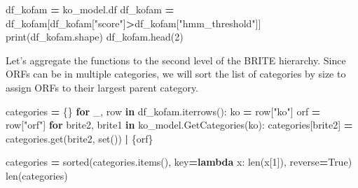 \documentclass[
]{book}
\newenvironment{Shaded}{\begin{snugshade}}{\end{snugshade}}
\newcommand{\BuiltInTok}[1]{#1}
\newcommand{\ControlFlowTok}[1]{\textcolor[rgb]{0.13,0.29,0.53}{\textbf{#1}}}
\newcommand{\DecValTok}[1]{\textcolor[rgb]{0.00,0.00,0.81}{#1}}
\newcommand{\KeywordTok}[1]{\textcolor[rgb]{0.13,0.29,0.53}{\textbf{#1}}}
\newcommand{\NormalTok}[1]{#1}
\newcommand{\OperatorTok}[1]{\textcolor[rgb]{0.81,0.36,0.00}{\textbf{#1}}}
\newcommand{\StringTok}[1]{\textcolor[rgb]{0.31,0.60,0.02}{#1}}
\newcommand{\VariableTok}[1]{\textcolor[rgb]{0.00,0.00,0.00}{#1}}
\begin{document}
\begin{Shaded}
\begin{Highlighting}[numbers=left,,]
\NormalTok{df\_kofam }\OperatorTok{=}\NormalTok{ ko\_model.df}
\NormalTok{df\_kofam }\OperatorTok{=}\NormalTok{ df\_kofam[df\_kofam[}\StringTok{"score"}\NormalTok{]}\OperatorTok{\textgreater{}}\NormalTok{df\_kofam[}\StringTok{"hmm\_threshold"}\NormalTok{]]}
\BuiltInTok{print}\NormalTok{(df\_kofam.shape)}
\NormalTok{df\_kofam.head(}\DecValTok{2}\NormalTok{)}
\end{Highlighting}
\end{Shaded}

Let's aggregate the functions to the second level of the BRITE hierarchy. Since ORFs can be in multiple categories,
we will sort the list of categories by size to assign ORFs to their largest parent category.

\begin{Shaded}
\begin{Highlighting}[numbers=left,,]
\NormalTok{categories }\OperatorTok{=}\NormalTok{ \{\}}
\ControlFlowTok{for}\NormalTok{ \_, row }\KeywordTok{in}\NormalTok{ df\_kofam.iterrows():}
\NormalTok{    ko }\OperatorTok{=}\NormalTok{ row[}\StringTok{"ko"}\NormalTok{]}
\NormalTok{    orf }\OperatorTok{=}\NormalTok{ row[}\StringTok{"orf"}\NormalTok{]}
    \ControlFlowTok{for}\NormalTok{ brite2, brite1 }\KeywordTok{in}\NormalTok{ ko\_model.GetCategories(ko):}
\NormalTok{        categories[brite2] }\OperatorTok{=}\NormalTok{ categories.get(brite2, }\BuiltInTok{set}\NormalTok{()) }\OperatorTok{|}\NormalTok{ \{orf\}}

\NormalTok{categories }\OperatorTok{=} \BuiltInTok{sorted}\NormalTok{(categories.items(), key}\OperatorTok{=}\KeywordTok{lambda}\NormalTok{ x: }\BuiltInTok{len}\NormalTok{(x[}\DecValTok{1}\NormalTok{]), reverse}\OperatorTok{=}\VariableTok{True}\NormalTok{)}
\BuiltInTok{len}\NormalTok{(categories)}
\end{Highlighting}
\end{Shaded}
\end{document}
